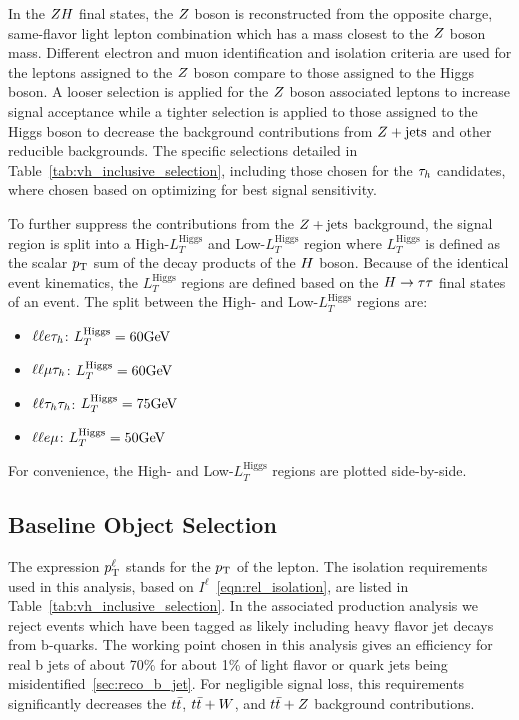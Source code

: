In the $ZH$ final states, the $Z$ boson is reconstructed from the opposite charge, same-flavor
light lepton combination which has a mass closest to the $Z$ boson mass. Different 
electron and muon identification and isolation criteria are used for the leptons 
assigned to the $Z$ boson compare to those assigned to the Higgs boson. A looser
selection is applied for the $Z$ boson associated leptons to increase signal acceptance
while a tighter selection is applied to those assigned to the Higgs boson to
decrease the background contributions from $Z+\textrm{jets}$ and other reducible
backgrounds. The specific selections detailed in Table~\ref{tab:vh_inclusive_selection},
including those chosen for the $\tau_{h}$ candidates, where chosen based on 
optimizing for best signal sensitivity.

To further suppress the contributions from the $Z+\textrm{jets}$ background, the signal 
region is split into a High-$L_{T}^{\textrm{Higgs}}$ and Low-$L_{T}^{\textrm{Higgs}}$
region where $L_{T}^{\textrm{Higgs}}$ is defined as the scalar $p_\mathrm{T}$ sum of the decay 
products of the $H$ boson. Because of the identical event kinematics, the 
$L_{T}^{\textrm{Higgs}}$ regions are defined based on the $H\to\tau\tau$ final 
states of an event. The split between the High- and Low-$L_{T}^{\textrm{Higgs}}$
regions are:
\begin{itemize}
\item $\ell\ell e\tau_{h}$: $L_{T}^{\textrm{Higgs}} = 60\mathrm{GeV}$
\item $\ell\ell\mu\tau_{h}$: $L_{T}^{\textrm{Higgs}} = 60\mathrm{GeV}$
\item $\ell\ell\tau_{h}\tau_{h}$: $L_{T}^{\textrm{Higgs}} = 75\mathrm{GeV}$
\item $\ell\ell e\mu$: $L_{T}^{\textrm{Higgs}} = 50\mathrm{GeV}$
\end{itemize}
For convenience, the High- and Low-$L_{T}^{\textrm{Higgs}}$ regions are plotted
side-by-side.



\subsection{Baseline Object Selection}
\label{sec:vh_obj_selection}

The expression $p_\mathrm{T}^{\ell}$ stands for the $p_\mathrm{T}$ of the lepton. The isolation 
requirements used in this analysis, based on $I^{\ell}$~\ref{eqn:rel_isolation}, 
are listed in Table~\ref{tab:vh_inclusive_selection}.
In the associated production analysis we reject events which have been tagged as likely
including heavy flavor jet decays from b-quarks.
The working point chosen 
in this analysis gives an efficiency for real b jets of about 70\% for 
about 1\% of light flavor or quark jets being misidentified~\ref{sec:reco_b_jet}.
For negligible signal loss, this requirements significantly decreases the $t\bar{t}$,
$t\bar{t}+W$, and $t\bar{t}+Z$ background contributions.


